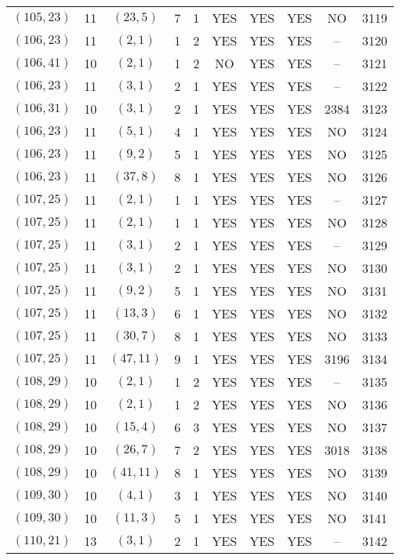 \begin{longtable}{|c|c|c|c|c|c|c|c|c|c|}
$(105, 23)$ & 11 & $(23, 5)$ & 7 & 1 & YES & YES & YES & NO & 3119\\
$(106, 23)$ & 11 & $(2, 1)$ & 1 & 2 & YES & YES & YES & -- & 3120\\
$(106, 41)$ & 10 & $(2, 1)$ & 1 & 2 & NO & YES & YES & -- & 3121\\
$(106, 23)$ & 11 & $(3, 1)$ & 2 & 1 & YES & YES & YES & -- & 3122\\
$(106, 31)$ & 10 & $(3, 1)$ & 2 & 1 & YES & YES & YES & 2384 & 3123\\
$(106, 23)$ & 11 & $(5, 1)$ & 4 & 1 & YES & YES & YES & NO & 3124\\
$(106, 23)$ & 11 & $(9, 2)$ & 5 & 1 & YES & YES & YES & NO & 3125\\
$(106, 23)$ & 11 & $(37, 8)$ & 8 & 1 & YES & YES & YES & NO & 3126\\
$(107, 25)$ & 11 & $(2, 1)$ & 1 & 1 & YES & YES & YES & -- & 3127\\
$(107, 25)$ & 11 & $(2, 1)$ & 1 & 1 & YES & YES & YES & NO & 3128\\
$(107, 25)$ & 11 & $(3, 1)$ & 2 & 1 & YES & YES & YES & -- & 3129\\
$(107, 25)$ & 11 & $(3, 1)$ & 2 & 1 & YES & YES & YES & NO & 3130\\
$(107, 25)$ & 11 & $(9, 2)$ & 5 & 1 & YES & YES & YES & NO & 3131\\
$(107, 25)$ & 11 & $(13, 3)$ & 6 & 1 & YES & YES & YES & NO & 3132\\
$(107, 25)$ & 11 & $(30, 7)$ & 8 & 1 & YES & YES & YES & NO & 3133\\
$(107, 25)$ & 11 & $(47, 11)$ & 9 & 1 & YES & YES & YES & 3196 & 3134\\
$(108, 29)$ & 10 & $(2, 1)$ & 1 & 2 & YES & YES & YES & -- & 3135\\
$(108, 29)$ & 10 & $(2, 1)$ & 1 & 2 & YES & YES & YES & NO & 3136\\
$(108, 29)$ & 10 & $(15, 4)$ & 6 & 3 & YES & YES & YES & NO & 3137\\
$(108, 29)$ & 10 & $(26, 7)$ & 7 & 2 & YES & YES & YES & 3018 & 3138\\
$(108, 29)$ & 10 & $(41, 11)$ & 8 & 1 & YES & YES & YES & NO & 3139\\
$(109, 30)$ & 10 & $(4, 1)$ & 3 & 1 & YES & YES & YES & NO & 3140\\
$(109, 30)$ & 10 & $(11, 3)$ & 5 & 1 & YES & YES & YES & NO & 3141\\
$(110, 21)$ & 13 & $(3, 1)$ & 2 & 1 & YES & YES & YES & -- & 3142\\

\end{longtable}
